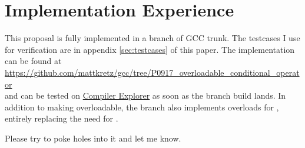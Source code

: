 \section{Implementation Experience}\label{sec:impl}

This proposal is fully implemented in a branch of GCC trunk.
The testcases I use for verification are in appendix \ref{sec:testcases} of this paper.
The implementation can be found at\\
\url{https://github.com/mattkretz/gcc/tree/P0917_overloadable_conditional_operator}\\
and can be tested on \href{https://compiler-explorer.com/}{Compiler Explorer}
as soon as the branch build lands.
In addition to making  overloadable, the branch also
implements  overloads for , entirely replacing
the need for .

Please try to poke holes into it and let me know.
